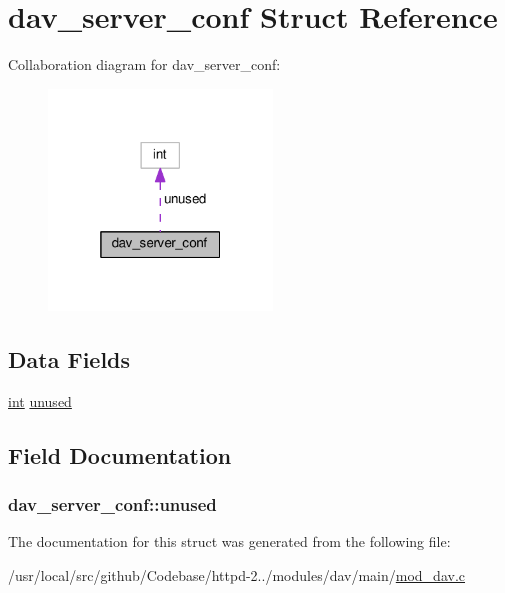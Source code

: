 \hypertarget{structdav__server__conf}{}\section{dav\+\_\+server\+\_\+conf Struct Reference}
\label{structdav__server__conf}


Collaboration diagram for dav\+\_\+server\+\_\+conf\+:
\nopagebreak
\begin{figure}[H]
\begin{center}
\leavevmode
\includegraphics[width=169pt]{structdav__server__conf__coll__graph}
\end{center}
\end{figure}
\subsection*{Data Fields}
\begin{DoxyCompactItemize}
\item 
\hyperlink{pcre_8txt_a42dfa4ff673c82d8efe7144098fbc198}{int} \hyperlink{structdav__server__conf_ab0e423484807159787caf9cb408b9cbe}{unused}
\end{DoxyCompactItemize}


\subsection{Field Documentation}
\subsubsection[{\texorpdfstring{unused}{unused}}]{ dav\+\_\+server\+\_\+conf\+::unused}\hypertarget{structdav__server__conf_ab0e423484807159787caf9cb408b9cbe}{}\label{structdav__server__conf_ab0e423484807159787caf9cb408b9cbe}


The documentation for this struct was generated from the following file\+:\begin{DoxyCompactItemize}
\item 
/usr/local/src/github/\+Codebase/httpd-\/2../modules/dav/main/\hyperlink{mod__dav_8c}{mod\+\_\+dav.\+c}\end{DoxyCompactItemize}
